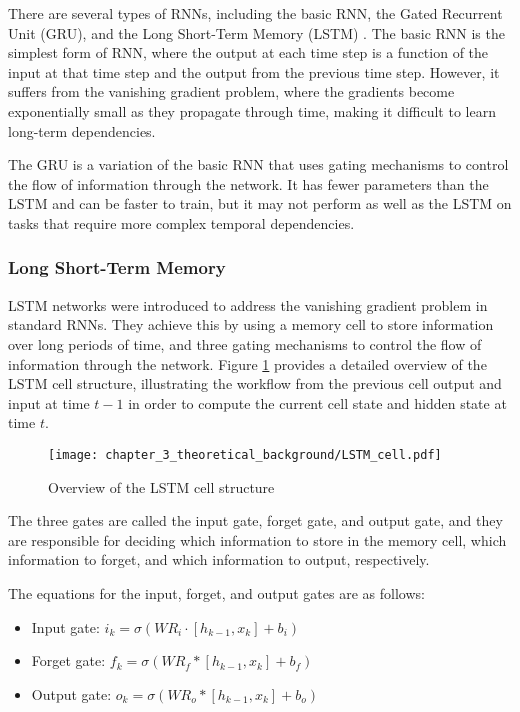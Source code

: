 There are several types of RNNs, including the basic RNN, the Gated Recurrent Unit (GRU), and the Long Short-Term Memory (LSTM) \cite{hochreiter1997long}. The basic RNN is the simplest form of RNN, where the output at each time step is a function of the input at that time step and the output from the previous time step. However, it suffers from the vanishing gradient problem, where the gradients become exponentially small as they propagate through time, making it difficult to learn long-term dependencies.

The GRU is a variation of the basic RNN that uses gating mechanisms to control the flow of information through the network. It has fewer parameters than the LSTM and can be faster to train, but it may not perform as well as the LSTM on tasks that require more complex temporal dependencies.

\subsubsection{Long Short-Term Memory}
\label{subsubsec:3_LSTMs}

LSTM networks were introduced to address the vanishing gradient problem in standard RNNs. They achieve this by using a memory cell to store information over long periods of time, and three gating mechanisms to control the flow of information through the network. Figure \ref{fig:chapter_3_theoretical_background/LSTM} provides a detailed overview of the LSTM cell structure, illustrating the workflow from the previous cell output and input at time $t-1$ in order to compute the current cell state and hidden state at time $t$.

\begin{figure}[h]
	\centering
	\texttt{[image: chapter\_3\_theoretical\_background/LSTM\_cell.pdf]}
	\caption{Overview of the LSTM cell structure}
	\label{fig:chapter_3_theoretical_background/LSTM}
\end{figure}

The three gates are called the input gate, forget gate, and output gate, and they are responsible for deciding which information to store in the memory cell, which information to forget, and which information to output, respectively.

The equations for the input, forget, and output gates are as follows:

\begin{itemize}
	\item Input gate: $i_k = \sigma(WR_i \cdot [h_{k-1}, x_k] + b_i)$
	\item Forget gate: $f_k = \sigma(WR_f * [h_{k-1}, x_k] + b_f)$
	\item Output gate: $o_k = \sigma(WR_o * [h_{k-1}, x_k] + b_o)$
\end{itemize}

